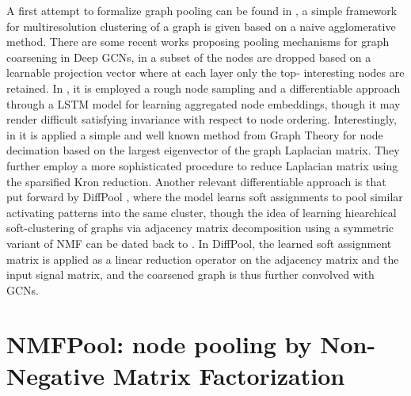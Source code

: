 \documentclass[runningheads]{llncs}
\begin{document}
A first attempt to formalize graph pooling can be found in \cite{bruna}, a simple framework for multiresolution clustering of a graph is given based on a naive agglomerative method. There are some recent works proposing pooling mechanisms for graph coarsening in Deep GCNs, in \cite{2018arXiv181101287C} a subset of the nodes are dropped based on a learnable projection vector where at each layer only the top- interesting nodes are retained.
In \cite{DBLP:journals/corr/HamiltonYL17}, it is employed a rough node sampling and a differentiable approach through a LSTM model for learning aggregated node embeddings, though it may render difficult satisfying invariance with respect to node ordering.
Interestingly, in \cite{DBLP:journals/corr/abs-1901-01343} it is applied a simple and well known method from Graph Theory for node decimation based on the largest eigenvector  of the graph Laplacian matrix. They further employ a more sophisticated procedure to reduce Laplacian matrix using the sparsified Kron reduction.
Another relevant differentiable approach is that
put forward by DiffPool \cite{NIPS2018_7729}, where the model learns soft assignments to pool similar activating patterns into the same cluster, though the idea of learning hiearchical soft-clustering of graphs via adjacency matrix decomposition using a symmetric variant of NMF can be dated back to \cite{NIPS2005_2948}. In DiffPool, the learned soft assignment matrix is applied as a linear reduction operator on the adjacency matrix and the input signal matrix, and the coarsened graph is thus further convolved with GCNs.




\section{NMFPool: node pooling by Non-Negative Matrix Factorization}
\end{document}
